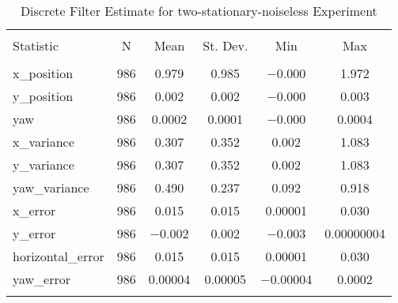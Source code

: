 
\begin{table}[h] \centering 
  \caption{Discrete Filter Estimate for two-stationary-noiseless Experiment} 
  \label{tab:two_stationary_noiseless_discrete_summary} 
\begin{tabular}{@{\extracolsep{5pt}}lccccc} 
\\[-1.8ex]\hline 
\hline \\[-1.8ex] 
Statistic & \multicolumn{1}{c}{N} & \multicolumn{1}{c}{Mean} & \multicolumn{1}{c}{St. Dev.} & \multicolumn{1}{c}{Min} & \multicolumn{1}{c}{Max} \\ 
\hline \\[-1.8ex] 
x\_position & 986 & 0.979 & 0.985 & $-$0.000 & 1.972 \\ 
y\_position & 986 & 0.002 & 0.002 & $-$0.000 & 0.003 \\ 
yaw & 986 & 0.0002 & 0.0001 & $-$0.000 & 0.0004 \\ 
x\_variance & 986 & 0.307 & 0.352 & 0.002 & 1.083 \\ 
y\_variance & 986 & 0.307 & 0.352 & 0.002 & 1.083 \\ 
yaw\_variance & 986 & 0.490 & 0.237 & 0.092 & 0.918 \\ 
x\_error & 986 & 0.015 & 0.015 & 0.00001 & 0.030 \\ 
y\_error & 986 & $-$0.002 & 0.002 & $-$0.003 & 0.00000004 \\ 
horizontal\_error & 986 & 0.015 & 0.015 & 0.00001 & 0.030 \\ 
yaw\_error & 986 & 0.00004 & 0.00005 & $-$0.00004 & 0.0002 \\ 
\hline \\[-1.8ex] 
\end{tabular} 
\end{table} 
